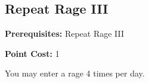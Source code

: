 \subsection{Repeat Rage III}\label{feat:repeatrage3}

\noindent
\textbf{Prerequisites:} Repeat Rage III

\noindent
\textbf{Point Cost:} 1

You may enter a rage 4 times per day.
